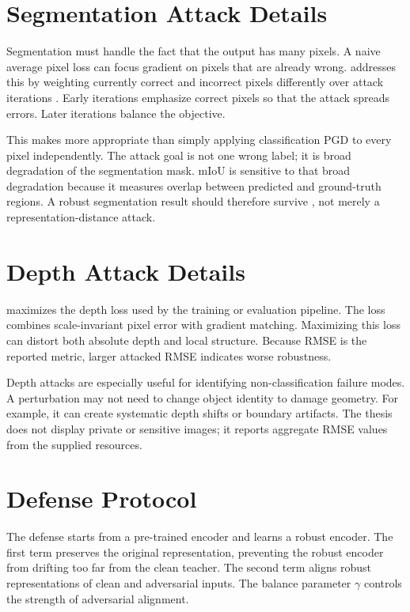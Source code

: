 \section{Segmentation Attack Details}

Segmentation \PGD must handle the fact that the output has many pixels. A naive average pixel loss can focus gradient on pixels that are already wrong. \SegPGD addresses this by weighting currently correct and incorrect pixels differently over attack iterations \parencite{gu2022segpgd}. Early iterations emphasize correct pixels so that the attack spreads errors. Later iterations balance the objective.

This makes \SegPGD more appropriate than simply applying classification PGD to every pixel independently. The attack goal is not one wrong label; it is broad degradation of the segmentation mask. mIoU is sensitive to that broad degradation because it measures overlap between predicted and ground-truth regions. A robust segmentation result should therefore survive \SegPGD, not merely a representation-distance attack.

\section{Depth Attack Details}

\DepthPGD maximizes the depth loss used by the training or evaluation pipeline. The loss combines scale-invariant pixel error with gradient matching. Maximizing this loss can distort both absolute depth and local structure. Because RMSE is the reported metric, larger attacked RMSE indicates worse robustness.

Depth attacks are especially useful for identifying non-classification failure modes. A perturbation may not need to change object identity to damage geometry. For example, it can create systematic depth shifts or boundary artifacts. The thesis does not display private or sensitive images; it reports aggregate RMSE values from the supplied resources.

\section{Defense Protocol}

The \DeACL defense starts from a pre-trained encoder and learns a robust encoder. The first term preserves the original representation, preventing the robust encoder from drifting too far from the clean teacher. The second term aligns robust representations of clean and adversarial inputs. The balance parameter $\gamma$ controls the strength of adversarial alignment.

